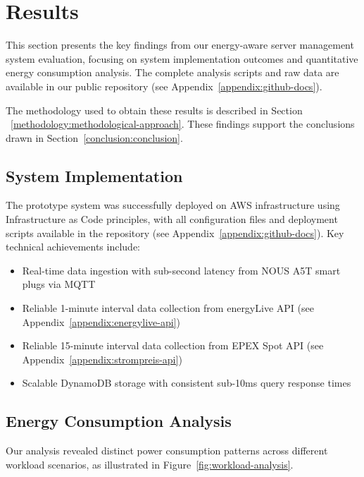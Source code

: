

\section{Results}
\label{results:results}
This section presents the key findings from our energy-aware server management system evaluation, 
focusing on system implementation outcomes and quantitative energy consumption analysis. 
The complete analysis scripts and raw data are available in our public repository 
(see Appendix~\ref{appendix:github-docs}).

The methodology used to obtain these results is described in Section ~\ref{methodology:methodological-approach}.
These findings support the conclusions drawn in Section~\ref{conclusion:conclusion}.

\subsection{System Implementation}
\label{results:system-implementation}
The prototype system was successfully deployed on AWS infrastructure using Infrastructure as Code 
principles, with all configuration files and deployment scripts available in the repository 
(see Appendix~\ref{appendix:github-docs}). Key technical achievements include:

\begin{itemize}[noitemsep,topsep=0pt]
    \item Real-time data ingestion with sub-second latency from NOUS A5T smart plugs via MQTT
    \item Reliable 1-minute interval data collection from energyLive API (see Appendix~\ref{appendix:energylive-api}) 
    \item Reliable 15-minute interval data collection from EPEX Spot API (see Appendix~\ref{appendix:strompreis-api})

    \item Scalable DynamoDB storage with consistent sub-10ms query response times
\end{itemize}

\subsection{Energy Consumption Analysis}
\label{results:energy-analysis}
Our analysis revealed distinct power consumption patterns across different workload scenarios, 
as illustrated in Figure~\ref{fig:workload-analysis}.

